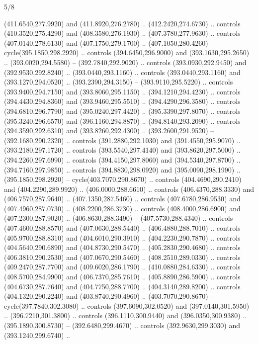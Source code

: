 \begin{flagdescription}{5/8}
\begin{scope}[xshift=0.5\flaglength,yshift=0.5\flagwidth,scale=\flagwidth/475.63]
\begin{scope}[y=0.8pt, x=0.8pt, yscale=-1, xscale=1,shift={(-450,-300)}]
\begin{scope}[cm={{1.0,0.0,0.0,1.0,(-0.0002,0.12556)}},cm={{1.0,0.0,0.0,1.0,(0.00179,0.0)}}]
\begin{scope}[fill=c00863d]
  (411.6540,277.9920) and (411.8920,276.2780) .. (412.2420,274.6730) .. controls
  (410.3520,275.4290) and (408.3580,276.1930) .. (407.3780,277.9630) .. controls
  (407.0140,278.6130) and (407.1750,279.1700) .. (407.1050,280.4260) --
  cycle(395.1850,298.2920) .. controls (394.6450,296.9000) and
  (393.1630,295.2650) .. (393.0020,294.5580) -- (392.7840,292.9020) .. controls
  (393.0930,292.9450) and (392.9530,292.8240) .. (393.0440,293.1160) .. controls
  (393.0440,293.1160) and (393.1270,294.0520) .. (393.2390,294.3150) --
  (393.9110,295.5220) .. controls (393.9400,294.7150) and (393.8060,295.1150) ..
  (394.1210,294.4230) .. controls (394.4430,294.8360) and (393.9460,295.5510) ..
  (394.4290,296.3580) .. controls (394.6810,296.7790) and (395.0240,297.4420) ..
  (395.3390,297.8070) .. controls (395.3240,296.6570) and (396.1160,294.8870) ..
  (394.8140,293.2090) .. controls (394.3590,292.6310) and (393.8260,292.4300) ..
  (393.2600,291.9520) -- (392.1680,290.2320) .. controls (391.2880,292.1030) and
  (391.4550,295.9070) .. (393.2180,297.1720) .. controls (393.5540,297.4140) and
  (393.8620,297.5000) .. (394.2260,297.6990) .. controls (394.4150,297.8060) and
  (394.5340,297.8700) .. (394.7160,297.9850) .. controls (394.8830,298.0920) and
  (395.0090,298.1990) .. (395.1850,298.2920) -- cycle(403.7070,290.8670) ..
  controls (404.4690,290.2410) and (404.2290,289.9920) .. (406.0000,288.6610) ..
  controls (406.4370,288.3330) and (406.7570,287.9640) .. (407.1350,287.5460) ..
  controls (407.6780,286.9530) and (407.4960,287.0730) .. (408.2200,286.3730) ..
  controls (408.4000,286.6900) and (407.2300,287.9020) .. (406.8630,288.3490) --
  (407.5730,288.4340) .. controls (407.4600,288.8570) and (407.0630,288.5440) ..
  (406.4880,288.7010) .. controls (405.9700,288.8310) and (404.6010,290.3910) ..
  (404.2230,290.7870) .. controls (404.5640,290.6890) and (404.8730,290.5470) ..
  (405.2830,290.4680) .. controls (406.3810,290.2530) and (407.0670,290.5460) ..
  (408.2510,289.0330) .. controls (409.2470,287.7700) and (409.6020,286.1790) ..
  (410.0880,284.6330) .. controls (408.5700,284.9900) and (406.7370,285.7610) ..
  (405.8890,286.5900) .. controls (404.6730,287.7640) and (404.7750,288.7700) ..
  (404.3140,289.8200) .. controls (404.1320,290.2240) and (403.8740,290.4960) ..
  (403.7070,290.8670) -- cycle(397.7840,302.3080) .. controls
  (397.6090,302.0520) and (397.0140,301.5950) .. (396.7210,301.3800) .. controls
  (396.1110,300.9440) and (396.0350,300.9380) .. (395.1890,300.8730) --
  (392.6480,299.4670) .. controls (392.9630,299.3030) and (393.1240,299.6740) ..

\end{scope}
\end{scope}
\end{scope}
\end{scope}
\end{flagdescription}
